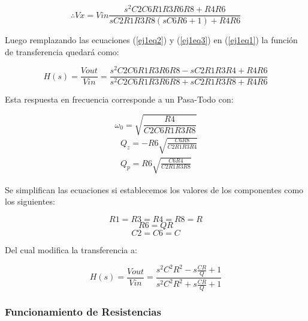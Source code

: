 \begin{equation}
    \therefore Vx = Vin\frac{s^2C2C6R1R3R6R8 + R4R6}{sC2R1R3R8(sC6R6 + 1) + R4R6}
    \label{ej1eq3}
\end{equation}

Luego remplazando las ecuaciones (\ref{ej1eq2}) y (\ref{ej1eq3}) en (\ref{ej1eq1}) la función de transferencia quedará como:

\begin{equation}
    H(s) = \frac{Vout}{Vin} = \frac{s^2C2C6R1R3R6R8 - sC2R1R3R4 + R4R6}{s^2C2C6R1R3R6R8 + sC2R1R3R8 + R4R6}
    \label{ej1eq4}
\end{equation}

Esta respuesta en frecuencia corresponde a un Pasa-Todo con:

\begin{equation}
\label{ej1eq5}
    \omega_0 = \sqrt{\frac{R4}{C2C6R1R3R8}}
\end{equation}
\begin{equation}
\begin{split}
\label{ej1eq6}
    &Q_z = -R6 \sqrt{\frac{C6R8}{C2R1R3R4}} \\
    &Q_p = R6 \sqrt{\frac{C6R4}{C2R1R3R8}}    
\end{split}
\end{equation}

Se simplifican las ecuaciones si establecemos los valores de los componentes como los siguientes:

$$R1 = R3 = R4 = R8 = R$$
$$R6 = Q  R $$
$$C2 = C6 = C$$

Del cual modifica la transferencia a:

\begin{equation}
    \label{ej1eq7}
     H(s) = \frac{Vout}{Vin} = \frac{s^2C^2R^2 - s\frac{CR}{Q} + 1}{s^2C^2R^2 + s\frac{CR}{Q} + 1}
\end{equation}

\subsubsection{Funcionamiento de Resistencias}

